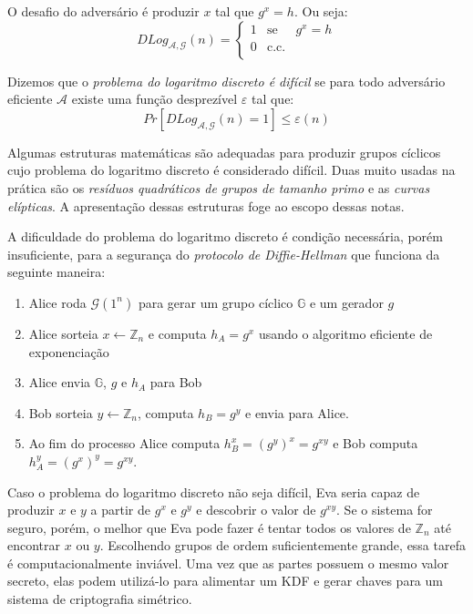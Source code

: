 O desafio do adversário é produzir $x$ tal que $g^x = h$.
Ou seja:
\begin{displaymath}
  DLog_{\mathcal{A}, \mathcal{G}}(n) = \left\{
    \begin{array}{lcl}
      1 & \textrm{se} & g^x = h\\
      0 & \textrm{c.c.} &\\
    \end{array}
    \right.
\end{displaymath}

Dizemos que o {\em problema do logaritmo discreto é difícil} se para todo adversário eficiente $\mathcal{A}$ existe uma função desprezível $\varepsilon$ tal que:
\begin{displaymath}
  Pr[DLog_{\mathcal{A}, \mathcal{G}}(n) = 1] \leq \varepsilon(n)
\end{displaymath}

Algumas estruturas matemáticas são adequadas para produzir grupos cíclicos cujo problema do logaritmo discreto é considerado difícil.
Duas muito usadas na prática são os {\em resíduos quadráticos de grupos de tamanho primo} e as {\em curvas elípticas}.
A apresentação dessas estruturas foge ao escopo dessas notas.

A dificuldade do problema do logaritmo discreto é condição necessária, porém insuficiente, para a segurança do {\em protocolo de Diffie-Hellman} que funciona da seguinte maneira:
\begin{enumerate}
\item Alice roda $\mathcal{G}(1^n)$ para gerar um grupo cíclico $\mathbb{G}$ e um gerador $g$
\item Alice sorteia $x \leftarrow \mathbb{Z}_n$ e computa $h_A = g^x$ usando o algoritmo eficiente de exponenciação
\item Alice envia $\mathbb{G}$, $g$ e $h_A$ para Bob
\item Bob sorteia $y \leftarrow \mathbb{Z}_n$, computa $h_B = g^y$ e envia para Alice.
\item Ao fim do processo Alice computa $h_B^x = (g^y)^x = g^{xy}$ e Bob computa $h_A^y = (g^x)^y = g^{xy}$.
\end{enumerate}

Caso o problema do logaritmo discreto não seja difícil, Eva seria capaz de produzir $x$ e $y$ a partir de $g^x$ e $g^y$ e descobrir o valor de $g^{xy}$.
Se o sistema for seguro, porém, o melhor que Eva pode fazer é tentar todos os valores de $\mathbb{Z}_n$ até encontrar $x$ ou $y$.
Escolhendo grupos de ordem suficientemente grande, essa tarefa é computacionalmente inviável.
Uma vez que as partes possuem o mesmo valor secreto, elas podem utilizá-lo para alimentar um KDF e gerar chaves para um sistema de criptografia simétrico.

